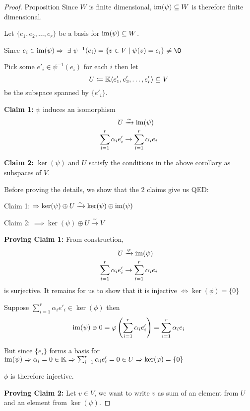 \begin{proof} {Proposition}
    Since \(W\) is finite dimensional, \(\mathrm{im}(\psi) \subseteq W\) is therefore finite dimensional.

    Let \(\{e_1, e_2, \dots, e_r\}\) be a basis for \(\mathrm{im}(\psi) \subseteq W\).

    Since \(e_i \in \im(\psi) \implies \exists \psi^{-1}(e_i) = \{v \in V \mid \psi(v) = e_i\} \neq \O\)

    Pick some \(e'_i \in \psi^{-1}(e_i)\) for each \(i\) then let \[
    U \coloneqq \mathbb{K}\langle e'_1, e'_2, \dots, e'_r\rangle \subseteq V
    \]
    be the subspace spanned by \(\{e'_i\}\).
    
    \textbf{Claim 1:} \(\psi\) induces an isomorphism 
    \begin{align*}
        U & \xrightarrow{\sim} \mathrm{im}(\psi) \\
        \sum_{i=1}^{r} \alpha_i e'_i & \to \sum_{i=1}^{r} \alpha_i e_i
    \end{align*}

    \textbf{Claim 2:} \(\ker(\psi)\) and \(U\) satisfy the conditions in the above corollary as subspaces of \(V\).

    Before proving the details, we show that the 2 claims give us QED:

    Claim 1: \(\Rightarrow \ker(\psi) \oplus U \xrightarrow{\sim} \ker(\psi) \oplus \mathrm{im}(\psi)\)
    
    Claim 2: \(\implies \ker(\psi) \oplus U \xrightarrow{\sim} V\) \qedhere

    \textbf{Proving Claim 1:} From construction, \begin{align*}
        U & \xrightarrow{\varphi} \mathrm{im}(\psi) \\
        \sum_{i=1}^{r} \alpha_i e'_i &\to \sum_{i=1}^{r} \alpha_i e_i
    \end{align*}
    is surjective. It remains for us to show that it is injective \(\Leftrightarrow \ker(\phi) = \{0\}\)

    Suppose \(\sum_{i=1}^{r} \alpha_i e'_i \in \ker(\phi)\) then \[
    \mathrm{im}(\psi) \ni 0 = \varphi\left(\sum_{i=1}^{r} \alpha_i e'_i\right) = \sum_{i=1}^{r} \alpha_i e_i
    \]

    But since \(\{e_i\}\) forms a basis for \(\mathrm{im}(\psi) \Rightarrow \alpha_i = 0 \in \mathbb{K} \Rightarrow \sum_{i=1}^{r} \alpha_i e'_i = 0 \in U \Rightarrow \ker(\varphi) = \{0\}\) 
    
    \(\phi\) is therefore injective.

    \textbf{Proving Claim 2:} Let \(v \in V\), we want to write \(v\) as sum of an element from \(U\) and an element from \(\ker(\psi)\).


\end{proof}
